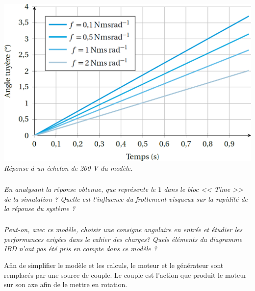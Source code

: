 \documentclass[10pt,fleqn]{article} %
\begin{document}
\begin{multicols}{2}
\begin{center}
\includegraphics[width=.95\linewidth]{images/fig_06}
\textit{Réponse à un échelon de 200 V du modèle.}
\end{center}
%
%
%
%

\subparagraph{}\textit{ En analysant la réponse obtenue, que représente le $1$ dans le bloc << Time >> de la simulation ? Quelle est l'influence du frottement visqueux sur la rapidité de la réponse du système ?}



\subparagraph{}\textit{ Peut-on, avec ce modèle, choisir une consigne angulaire en entrée et étudier les performances exigées dans le cahier des charges? Quels éléments du diagramme IBD n'ont pas été pris en compte dans ce modèle ?}

Afin de simplifier le modèle et les calculs, le moteur et le générateur sont remplacés par une source de couple. Le couple est l'action que produit le moteur sur son axe afin de le mettre en rotation.%


\end{multicols}
\end{document}
